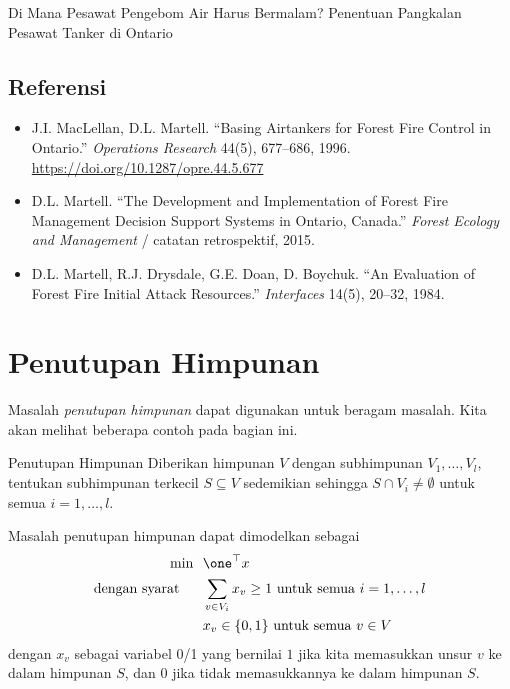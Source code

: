 \begin{casestudybox}{Di Mana Pesawat Pengebom Air Harus Bermalam? Penentuan Pangkalan Pesawat Tanker di Ontario}
\subsection*{Referensi}
\begin{itemize}
\item J.I. MacLellan, D.L. Martell. ``Basing Airtankers for Forest Fire Control in Ontario.'' \emph{Operations Research} 44(5), 677--686, 1996. \url{https://doi.org/10.1287/opre.44.5.677}
\item D.L. Martell. ``The Development and Implementation of Forest Fire Management Decision Support Systems in Ontario, Canada.'' \emph{Forest Ecology and Management} / catatan retrospektif, 2015.
\item D.L. Martell, R.J. Drysdale, G.E. Doan, D. Boychuk. ``An Evaluation of Forest Fire Initial Attack Resources.'' \emph{Interfaces} 14(5), 20--32, 1984.
\end{itemize}
\end{casestudybox}

\section{Penutupan Himpunan}

Masalah \emph{penutupan himpunan} dapat digunakan untuk beragam masalah. Kita akan melihat beberapa contoh pada bagian ini.

\begin{general}{Penutupan Himpunan}{\npcomplete}
\label{general:set-covering}
Diberikan himpunan $V$ dengan subhimpunan $V_1, \dots, V_l$, tentukan subhimpunan terkecil $S \subseteq V$ sedemikian sehingga
$S \cap V_i \neq \emptyset$ untuk semua $i=1, \dots, l$.

Masalah penutupan himpunan dapat dimodelkan sebagai
\begin{equation}
\begin{split}
\min \ \ & \one^\top x\\
\st \ \ & \sum_{v \in V_i} x_v \geq 1 \text{ untuk semua } i =1, \dots, l \\ 
& x_v \in \{0,1\} \text{ untuk semua } v \in V
\end{split}
\end{equation}
dengan $x_v$ sebagai variabel 0/1 yang bernilai $1$ jika kita memasukkan unsur $v$ ke dalam himpunan $S$, dan $0$ jika tidak memasukkannya ke dalam himpunan $S$.
\end{general}

